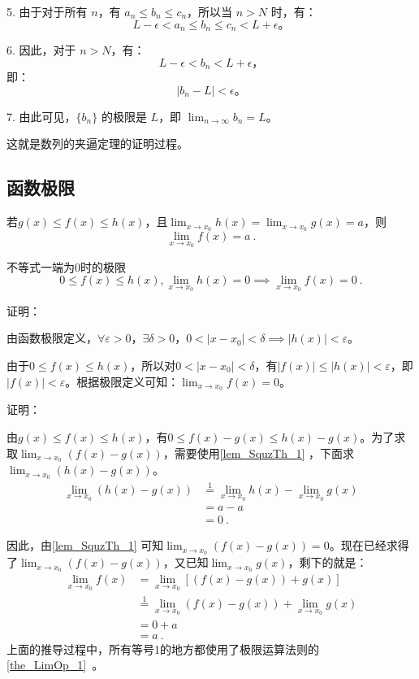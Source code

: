 5. 由于对于所有 $n$，有 $a_n \leq b_n \leq c_n$，所以当 $n > N$ 时，有：
   \[
   L - \epsilon < a_n \leq b_n \leq c_n < L + \epsilon。
   \]

6. 因此，对于 $n > N$，有：
   \[
   L - \epsilon < b_n < L + \epsilon，
   \]
   即：
   \[
   |b_n - L| < \epsilon。
   \]

7. 由此可见，$\{b_n\}$ 的极限是 $L$，即 $\lim_{n \to \infty} b_n = L$。

这就是数列的夹逼定理的证明过程。

\subsection{函数极限}

若$g(x)\leq f(x)\leq h(x)$，且$\lim _{x\to x_0}h(x)=\lim _{x\to x_0}g(x)=a$，则
\begin{equation}
\lim _{x\to x_0}f(x)=a~.
\end{equation}

\begin{lemma}{不等式一端为0时的极限}\label{lem_SquzTh_1}
\begin{equation}
0\leq f(x)\leq h(x),\lim _{x\to x_0}h(x)=0\implies\lim _{x\to x_0}f(x)=0~.
\end{equation}

证明：

由函数极限定义，$\forall\varepsilon>0$，$\exists\delta>0$，$0<|x-x_0|<\delta\implies|h(x)|<\varepsilon$。

由于$0\leq f(x)\leq h(x)$，所以对$0<|x-x_0|<\delta$，有$|f(x)|\leq |h(x)|<\varepsilon$，即$|f(x)|<\varepsilon$。根据极限定义可知：$\lim _{x\to x_0}f(x)=0$。

\end{lemma}

证明：

由$g(x)\leq f(x)\leq h(x)$，有$0\leq f(x)-g(x)\leq h(x)-g(x)$。为了求取$\lim _{x\to x_0}(f(x)-g(x))$，需要使用\autoref{lem_SquzTh_1} ，下面求$\lim _{x\to x_0}(h(x)-g(x))$。
$$
\begin{align*}
\lim _{x\to x_0}(h(x)-g(x))&\overset{\mathrm{1}}{=}\lim _{x\to x_0}h(x)-\lim _{x\to x_0}g(x)\\
&=a-a\\
&=0~.
\end{align*}
$$

因此，由\autoref{lem_SquzTh_1} 可知$\lim _{x\to x_0}(f(x)-g(x))=0$。现在已经求得了$\lim _{x\to x_0}(f(x)-g(x))$，又已知$\lim _{x\to x_0}g(x)$，剩下的就是：
$$
\begin{align*}
\lim _{x\to x_0}f(x) &= \lim _{x\to x_0}[(f(x)-g(x))+g(x)] \\ 
&\overset{\mathrm{1}}{=} \lim _{x\to x_0}(f(x)-g(x))+\lim _{x\to x_0}g(x)\\ 
&= 0+a\\ 
&=a~.\end{align*}
$$
上面的推导过程中，所有等号1的地方都使用了极限运算法则的\autoref{the_LimOp_1}~。

